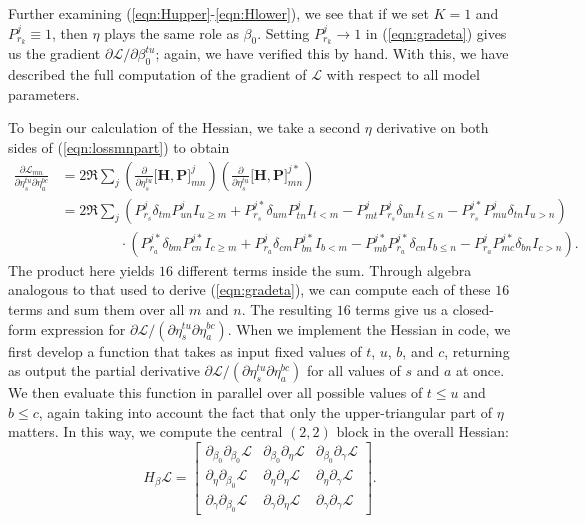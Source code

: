 \documentclass[10pt]{article}
\begin{document}
Further examining (\ref{eqn:Hupper}-\ref{eqn:Hlower}), we see that if we set $K=1$ and $P^j_{r_k} \equiv 1$, then $\eta$ plays the same role as $\beta_0$.  Setting $P^j_{r_k} \to 1$ in (\ref{eqn:gradeta}) gives us  the gradient $\partial \mathcal{L} / \partial \beta_0^{tu}$; again, we have verified this by hand.  With this, we have described the full computation of the gradient of $\mathcal{L}$ with respect to all model parameters.

To begin our calculation of the Hessian, we take a second $\eta$ derivative on both sides of (\ref{eqn:lossmnpart}) to obtain
\begin{align*}
\frac{\partial \mathcal{L}_{mn}}{\partial \eta_{s}^{tu} \partial \eta_{a}^{bc}} &= 2 \Re \sum_{j} \left( \frac{\partial}{\partial \eta_{s}^{tu}} \big [  \mathbf{H} , \mathbf{P} \big]^j_{mn} \right) \left( \frac{\partial}{\partial \eta_{s}^{tu}} \big [  \mathbf{H} , \mathbf{P} \big]^{j\ast}_{mn} \right) \\
 &= 2 \Re \sum_j (P_{r_s}^j \delta_{tm} P^j_{un} I_{u \geq m} + P_{r_s}^{j\ast} \delta_{um} P^j_{tn}  I_{t < m} - P^j_{mt} P_{r_s}^j  \delta_{un} I_{t \leq n} - P_{r_s}^{j\ast} P_{mu}^j \delta_{tn} I_{u>n})\\
 &\quad \quad \quad \quad \ \cdot 
 (P_{r_a}^{j\ast} \delta_{bm} P^{j\ast}_{cn} I_{c \geq m} + P_{r_a}^{j} \delta_{cm} P^{j\ast}_{bn}  I_{b < m} - P^{j\ast}_{mb} P_{r_a}^{j\ast}  \delta_{cn} I_{b \leq n} - P_{r_a}^{j} P_{mc}^{j\ast} \delta_{bn} I_{c>n}).
\end{align*}
The product here yields $16$ different terms inside the sum.  Through algebra analogous to that used to derive (\ref{eqn:gradeta}), we can compute each of these $16$ terms and sum them over all $m$ and $n$.  The resulting $16$ terms give us a closed-form expression for $\partial \mathcal{L}/(\partial \eta_{s}^{tu} \partial \eta_{a}^{bc})$.  When we implement the Hessian in code, we first develop a function that takes as input fixed values of $t$, $u$, $b$, and $c$, returning as output the partial derivative $\partial \mathcal{L}/(\partial \eta_{s}^{tu} \partial \eta_{a}^{bc})$ for all values of $s$ and $a$ at once.  We then evaluate this function in parallel over all possible values of $t \leq u$ and $b \leq c$, again taking into account the fact that only the upper-triangular part of $\eta$ matters.  In this way, we compute the central $(2,2)$ block in the overall Hessian:
\begin{equation}
\label{eqn:overallhess}
H_{\beta} \mathcal{L} = \begin{bmatrix} \partial_{\beta_0} \partial_{\beta_0} \mathcal{L} & \partial_{\beta_0} \partial_{\eta} \mathcal{L} & \partial_{\beta_0} \partial_{\gamma} \mathcal{L} \\
 \partial_{\eta} \partial_{\beta_0} \mathcal{L} & \partial_{\eta} \partial_{\eta} \mathcal{L} & \partial_{\eta} \partial_{\gamma} \mathcal{L} \\
 \partial_{\gamma} \partial_{\beta_0} \mathcal{L} & \partial_{\gamma} \partial_{\eta} \mathcal{L} & \partial_{\gamma} \partial_{\gamma} \mathcal{L} \end{bmatrix}.
\end{equation}
\end{document}
